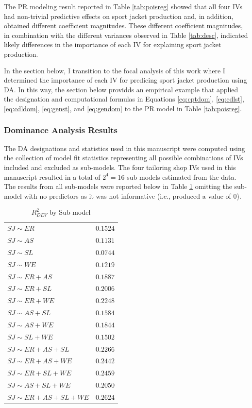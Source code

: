 \documentclass[man]{apa7}
\begin{document}
	The PR modeling result reported in Table \ref{tab:poisreg} showed that all four IVs had non-trivial predictive effects on sport jacket production and, in addition, obtained different coefficient magnitudes.
	These different coefficient magnitudes, in combination with the different variances observed in Table \ref{tab:desc}, indicated likely differences in the importance of each IV for explaining sport jacket production.
	
	In the section below, I transition to the focal analysis of this work where I determined the importance of each IV for predicing sport jacket production using DA.
	In this way, the section below providds an empirical example that applied the designation and computational formulas in Equations \ref{eq:cptdom}, \ref{eq:cdlst}, \ref{eq:cdldom}, \ref{eq:genst}, and \ref{eq:gendom} to the PR model in Table \ref{tab:poisreg}.
	
		\subsubsection{Dominance Analysis Results}
	
	The DA designations and statistics used in this manuscript were computed using the collection of model fit statistics representing all possible combinations of IVs included and excluded as sub-models.
	The four tailoring shop IVs used in this manuscript resulted in a total of $2^4 = 16$ sub-models estimated from the data.
	The results from all sub-models were reported below in Table \ref{tab:r2sub} omitting the sub-model with no predictors as it was not informative (i.e., produced a value of 0).
	
	\begin{table}[h!]
		\centering
		\caption{\centering $R^2_{DEV}$ by Sub-model}
		\begin{tabular}{l|r}
			\hline 
			$SJ \sim ER$ & $0.1524$ \\ 
			$SJ \sim AS$ & $0.1131$ \\ 
			$SJ \sim SL$ & $0.0744$ \\ 
			$SJ \sim WE$ & $0.1219$ \\ 
			$SJ \sim ER + AS$ & $0.1887$ \\ 
			$SJ \sim ER + SL$ & $0.2006$ \\ 
			$SJ \sim ER + WE$ & $0.2248$ \\ 
			$SJ \sim AS + SL$ & $0.1584$ \\ 
			$SJ \sim AS + WE$ & $0.1844$ \\ 
			$SJ \sim SL + WE$ & $0.1502$ \\ 
			$SJ \sim ER + AS + SL$ & $0.2266$\\ 
			$SJ \sim ER + AS + WE$ & $0.2442$ \\ 
			$SJ \sim ER + SL + WE$ & $0.2459$ \\ 
			$SJ \sim AS + SL + WE$ & $0.2050$ \\ 
			$SJ \sim ER + AS + SL + WE$ & $0.2624$ \\ 
			\hline 
		\end{tabular}
		\label{tab:r2sub}
	\end{table} 
\end{document}
